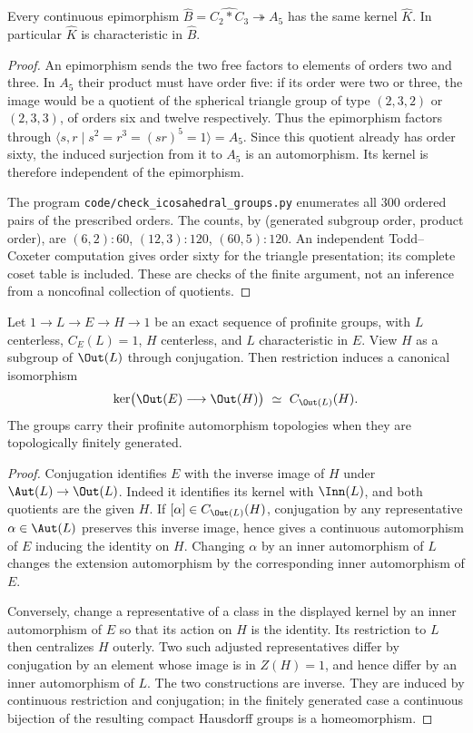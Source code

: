 Every continuous epimorphism
\(\widehat B=\widehat{C_2*C_3}\twoheadrightarrow A_5\) has the same
kernel \(\widehat K\). In particular \(\widehat K\) is characteristic
in \(\widehat B\).
\begin{proof}
An epimorphism sends the two free factors to elements of orders
two and three. In \(A_5\) their product must have order five:
if its order were two or three, the image would be a quotient of
the spherical triangle group of type \((2,3,2)\) or \((2,3,3)\),
of orders six and twelve respectively. Thus the epimorphism factors
through \(\langle s,r\mid s^2=r^3=(sr)^5=1\rangle=A_5\).
Since this quotient already has order sixty, the induced surjection
from it to \(A_5\) is an automorphism. Its kernel is therefore
independent of the epimorphism.

The program \texttt{code/check\_icosahedral\_groups.py} enumerates all
300 ordered pairs of the prescribed orders. The counts, by
(generated subgroup order, product order), are
\((6,2):60\), \((12,3):120\), \((60,5):120\).
An independent Todd--Coxeter computation gives order sixty for
the triangle presentation; its complete coset table is included.
These are checks of the finite argument, not an inference from a
noncofinal collection of quotients.
\end{proof}

Let \(1\to L\to E\to H\to1\) be an exact sequence of profinite groups,
with \(L\) centerless, \(C_E(L)=1\), \(H\) centerless, and \(L\)
characteristic in \(E\). View \(H\) as a subgroup of \(\Out(L)\)
through conjugation. Then restriction induces a canonical isomorphism
\[
 \ker\bigl(\Out(E)\longrightarrow\Out(H)\bigr)
       \ \simeq\ C_{\Out(L)}(H).
\]
The groups carry their profinite automorphism topologies when they are
topologically finitely generated.
\begin{proof}
Conjugation identifies \(E\) with the inverse image of \(H\) under
\(\Aut(L)\to\Out(L)\). Indeed it identifies its kernel with
\(\Inn(L)\), and both quotients are the given \(H\).
If \([\alpha]\in C_{\Out(L)}(H)\), conjugation by any representative
\(\alpha\in\Aut(L)\) preserves this inverse image, hence gives a
continuous automorphism of \(E\) inducing the identity on \(H\).
Changing \(\alpha\) by an inner automorphism of \(L\) changes the
extension automorphism by the corresponding inner automorphism
of \(E\).

Conversely, change a representative of a class in the displayed
kernel by an inner automorphism of \(E\) so that its action on \(H\)
is the identity. Its restriction to \(L\) then centralizes \(H\)
outerly. Two such adjusted representatives differ by conjugation
by an element whose image is in \(Z(H)=1\), and hence differ by an
inner automorphism of \(L\). The two constructions are inverse.
They are induced by continuous restriction and conjugation; in the
finitely generated case a continuous bijection of the resulting
compact Hausdorff groups is a homeomorphism.
\end{proof}

